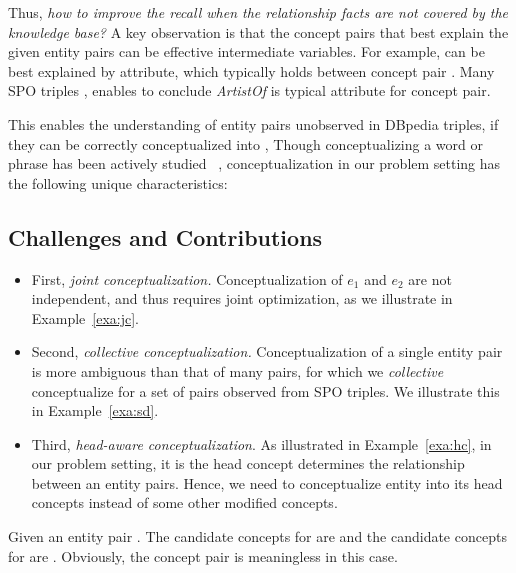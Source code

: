 Thus, {\it how to improve the recall when the relationship facts are not covered by the knowledge base?}
A key observation is that the concept pairs
that best explain the given entity pairs can be effective intermediate 
variables. 
For example,  can be best explained by  attribute, 
which typically holds between concept pair
. 
Many SPO triples
, 
enables to conclude \emph{ArtistOf} is typical attribute for
concept pair.


This enables the understanding of entity pairs unobserved in DBpedia triples,
if they can be correctly conceptualized into
,
Though conceptualizing a word or phrase
has been actively studied
~\cite{song2011short,kim2013context}, conceptualization in our problem setting has the following unique characteristics:



\subsection{Challenges and Contributions}

\begin{itemize}
\item First,  {\it joint conceptualization.} Conceptualization of
$e_1$ and $e_2$ are not independent, and thus requires joint optimization, 
as we illustrate in Example~\ref{exa:jc}.
\item Second, {\it collective conceptualization.} 
Conceptualization of a single entity pair is more ambiguous than that of many pairs, for which we \emph{collective} conceptualize for a set of pairs observed from SPO triples.
We illustrate this in Example~\ref{exa:sd}.
\item Third, {\it head-aware conceptualization}. As illustrated in Example~\ref{exa:hc}, in our problem setting, it is the head concept determines the relationship between an entity pairs. Hence, we need to conceptualize entity into its head concepts instead of some other modified concepts. 
\end{itemize}

\begin{example}
Given an entity pair . The candidate concepts for  are  and the candidate concepts for  are . Obviously, the concept pair  is meaningless in this case.
\label{exa:jc}
\end{example}


